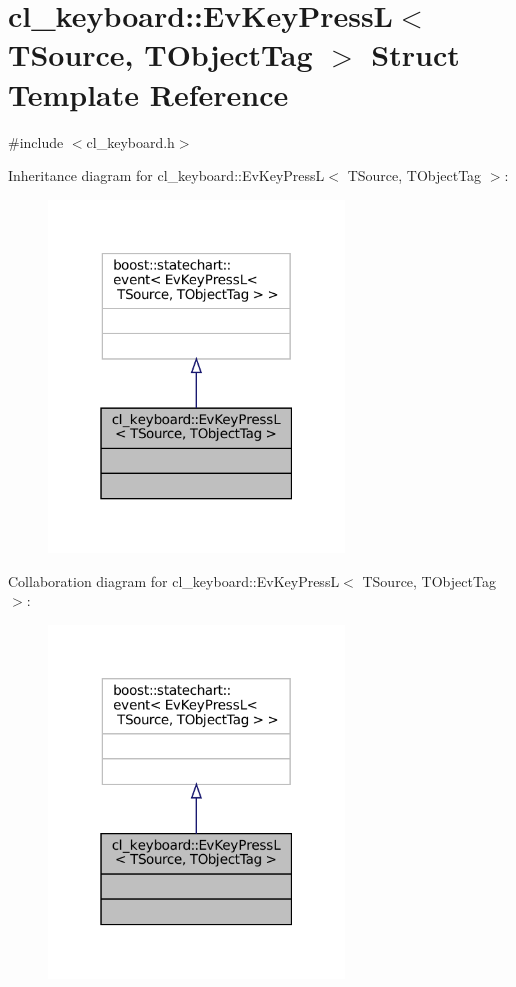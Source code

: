 \hypertarget{structcl__keyboard_1_1EvKeyPressL}{}\section{cl\+\_\+keyboard\+:\+:Ev\+Key\+PressL$<$ T\+Source, T\+Object\+Tag $>$ Struct Template Reference}
\label{structcl__keyboard_1_1EvKeyPressL}


{\ttfamily \#include $<$cl\+\_\+keyboard.\+h$>$}



Inheritance diagram for cl\+\_\+keyboard\+:\+:Ev\+Key\+PressL$<$ T\+Source, T\+Object\+Tag $>$\+:
\nopagebreak
\begin{figure}[H]
\begin{center}
\leavevmode
\includegraphics[width=223pt]{structcl__keyboard_1_1EvKeyPressL__inherit__graph}
\end{center}
\end{figure}


Collaboration diagram for cl\+\_\+keyboard\+:\+:Ev\+Key\+PressL$<$ T\+Source, T\+Object\+Tag $>$\+:
\nopagebreak
\begin{figure}[H]
\begin{center}
\leavevmode
\includegraphics[width=223pt]{structcl__keyboard_1_1EvKeyPressL__coll__graph}
\end{center}
\end{figure}


